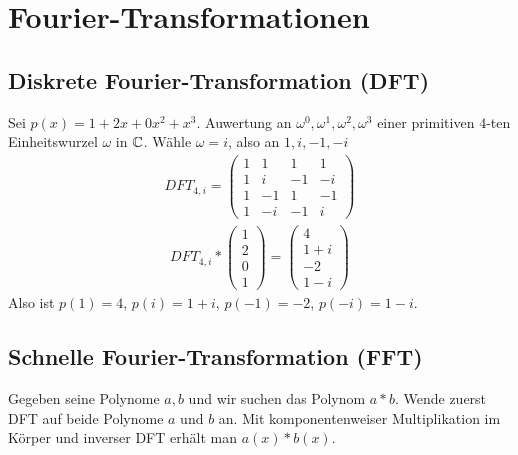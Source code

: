\section{Fourier-Transformationen}
\subsection{Diskrete Fourier-Transformation (DFT)}
\begin{bsp}
	Sei $p(x) = 1+2x+0x^2+x^3$. Auwertung an $\omega^0, \omega^1, \omega^2, \omega^3$ einer primitiven $4$-ten Einheitswurzel $\omega$ in $\mathbb{C}$. Wähle $\omega = i$, also an $1, i, -1, -i$
	\begin{align*}
		DFT_{4,i} = 
		\begin{pmatrix}
		1 & 1 & 1 & 1 \\
		1 & i & -1 & -i \\
		1 & -1 & 1 & -1 \\
		1 & -i & -1 & i
		\end{pmatrix}
	\end{align*}
	\begin{align*}
		DFT_{4,i} * \begin{pmatrix} 1 \\ 2 \\ 0 \\ 1 \end{pmatrix}
		= \begin{pmatrix}
		4 \\ 1+i \\ -2 \\ 1-i
		\end{pmatrix}
	\end{align*}
	Also ist $p(1) = 4$, $p(i) = 1+i$, $p(-1) = -2$, $p(-i) = 1-i$.
\end{bsp}

\subsection{Schnelle Fourier-Transformation (FFT)}
\begin{bem}[Polynommultiplikation]
	Gegeben seine Polynome $a, b$ und wir suchen das Polynom $a*b$. Wende zuerst DFT auf beide Polynome $a$ und $b$ an. Mit komponentenweiser Multiplikation im Körper und inverser DFT erhält man $a(x)*b(x)$.
\end{bem}


